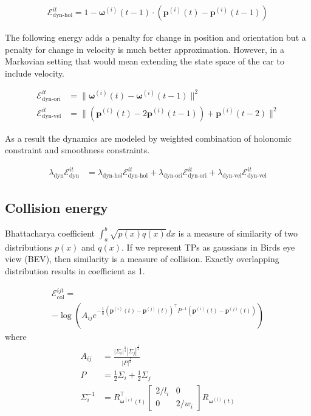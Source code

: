 \documentclass[10pt,twocolumn,letterpaper]{article}
\newcommand{\pos}[2]{\mathbf{p}^{(#1)}(#2)}
\newcommand{\ori}[2]{\mathbf{\omega}^{(#1)}(#2)}
\newcommand{\Energy}[1]{\mathcal{E}^{it}_{\text{#1}}}
\newcommand{\WEnergy}[1]{\lambda_{\text{#1}}\Energy{#1}}
\newcommand{\EnergyCol}{\mathcal{E}^{ijt}_{\text{col}}}
\begin{document}
\begin{align}
  \label{eq:totalPosTransitionEnergy}
  \Energy{dyn-hol} = 1 - \ori{i}{t-1} \cdot (\pos{i}{t} - \pos{i}{t-1})
\end{align}

The following energy adds a penalty for change in position and orientation
but a penalty for change in velocity is much better approximation. However, in
a Markovian setting that would mean extending the state space of the car to
include velocity.

\begin{align}
  \Energy{dyn-ori} &= \|\ori{i}{t} - \ori{i}{t-1}\|^2\\
  \Energy{dyn-vel} &= \|(\pos{i}{t} - 2\pos{i}{t-1}) + \pos{i}{t-2}\|^2
\end{align}

As a result the dynamics are modeled by weighted combination of holonomic
constraint and smoothness constraints.

\begin{align}
  \WEnergy{dyn} &= \WEnergy{dyn-hol} + \WEnergy{dyn-ori} + \WEnergy{dyn-vel}
\end{align}

 
\subsection{Collision energy}

Bhattacharya coefficient $\int_a^b\sqrt{p(x)q(x)}dx$ is a measure of similarity
of two distributions $p(x)$ and $q(x)$. If we represent TPs as gaussians in
Birds eye view (BEV), then similarity is a measure of collision. Exactly
overlapping distribution results in coefficient as 1. 

\begin{multline}
  \label{eq:collisionEnergyHellingerDistance}
  \EnergyCol =\\ -\log\left(
  A_{ij}
  e^{-\frac{1}{8}
    \left(\pos{i}{t} - \pos{j}{t}\right)^\top
    P^{-1}
    \left(\pos{i}{t} - \pos{j}{t}\right)
    }
    \right)
\end{multline}
where 
\begin{align}
  A_{ij} &= \frac{|\Sigma_i|^\frac{1}{4}|\Sigma_j|^\frac{1}{4}}
  {|P|^\frac{1}{2}}\\
  P &= \frac{1}{2}\Sigma_i + \frac{1}{2}\Sigma_j\\
\Sigma_i^{-1} &= R^\top_{\ori{i}{t}} \begin{bmatrix} 2/l_i & 0 \\ 0 & 2/w_i \end{bmatrix}
R_{\ori{i}{t}}
\end{align}
\end{document}
